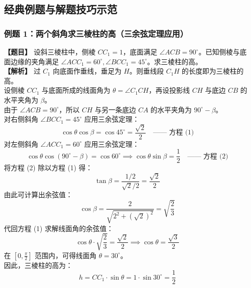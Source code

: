 \documentclass[11pt,a4paper]{ctexart}
\begin{document}
\subsection{经典例题与解题技巧示范}

\subsubsection{例题 1：两个斜角求三棱柱的高（三余弦定理应用）}
\textbf{【题目】} 设斜三棱柱中，侧棱 $CC_1 = 1$，底面满足 $\angle ACB = 90^\circ$。已知侧棱与底面边缘的夹角满足 $\angle ACC_1 = 60^\circ, \angle BCC_1 = 45^\circ$。求三棱柱的高。\\
\textbf{【解析】} 过 $C_1$ 向底面作垂线，垂足为 $H$。则垂线段 $C_1H$ 的长度即为三棱柱的高。\\
设侧棱 $CC_1$ 与底面所成的线面角为 $\theta = \angle C_1CH$，再设投影线 $CH$ 与底边 $CB$ 的水平夹角为 $\beta$。\\
由于 $\angle ACB = 90^\circ$，所以 $CH$ 与另一条底边 $CA$ 的水平夹角为 $90^\circ - \beta$。\\
对右侧斜角 $\angle BCC_1 = 45^\circ$ 应用三余弦定理：
\[ \cos\theta \cos\beta = \cos 45^\circ = \frac{\sqrt{2}}{2} \quad \text{—— 方程 (1)} \]
对左侧斜角 $\angle ACC_1 = 60^\circ$ 应用三余弦定理：
\[ \cos\theta \cos(90^\circ - \beta) = \cos 60^\circ \implies \cos\theta \sin\beta = \frac{1}{2} \quad \text{—— 方程 (2)} \]
将方程 (2) 除以方程 (1) 得：
\[ \tan\beta = \frac{1/2}{\sqrt{2}/2} = \frac{\sqrt{2}}{2} \]
由此可计算出余弦值：
\[ \cos\beta = \frac{2}{\sqrt{2^2 + (\sqrt{2})^2}} = \sqrt{\frac{2}{3}} \]
代回方程 (1) 求解线面角的余弦值：
\[ \cos\theta \cdot \sqrt{\frac{2}{3}} = \frac{\sqrt{2}}{2} \implies \cos\theta = \frac{\sqrt{3}}{2} \]
在 $\left[0, \frac{\pi}{2}\right]$ 范围内，可得线面角 $\theta = 30^\circ$。\\
因此，三棱柱的高为：
\[ h = CC_1 \cdot \sin\theta = 1 \cdot \sin 30^\circ = \frac{1}{2} \]
\end{document}
